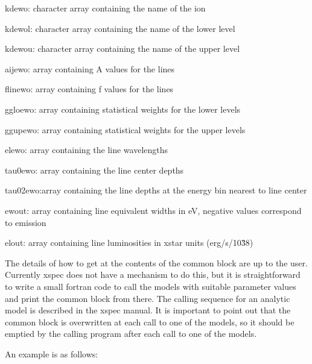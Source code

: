 kdewo:   character array containing the name of the ion

kdewol:  character array containing the name of the lower level

kdewou:  character array containing the name of the upper level

aijewo:  array containing A values for the lines

flinewo: array containing f values for the lines

ggloewo: array containing statistical weights for the lower levels

ggupewo: array containing statistical weights for the upper levels

elewo:   array containing the line wavelengths

tau0ewo: array containing the line center depths

tau02ewo:array containing the line depths at the energy bin nearest to line center

ewout:   array containing line equivalent widths in eV, negative values correspond to emission

elout:   array containing line luminosities in xstar units (erg/s/10\^38)


The details of how to get at the contents of the common block are up to the user.
Currently xspec does not have a mechanism to do this, but it is straightforward to write 
a small fortran code to call the models with suitable parameter values and print the 
common block from there.  The calling sequence for 
an analytic model is described in the xspec manual.
It is important to point out that the common block is 
overwritten at each call to one of the models, so it should be emptied by the calling 
program after each call to one of the models.


An example is as follows:

